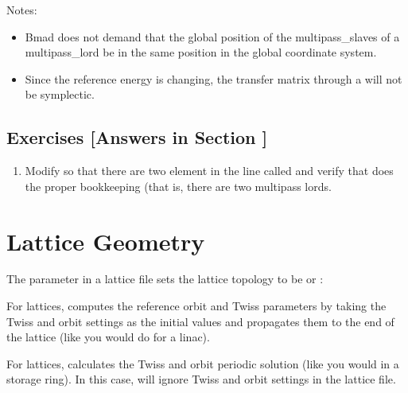 \documentclass{hitec}     %
\newcommand{\Section}[1]{\section{#1}\vspace*{-1ex}}
\begin{document}
Notes:
\vspace{-5 pt}
\begin{itemize}
\item 
Bmad does not demand that the global position of the multipass_slaves of a multipass_lord be in
the same position in the global coordinate system.
\item
Since the reference energy is changing, the transfer matrix through a  will
not be symplectic.
\end{itemize}

\newpage

\subsection{Exercises [Answers in Section ]}
\label{s:multipass.ex}

\begin{enumerate}[label=\thesection.\arabic{enumi}]
\item
Modify  so that there are two element in the  line called  and
verify that \bmad does the proper bookkeeping (that is, there are two  multipass lords.
\end{enumerate}

\newpage

\Section{Lattice Geometry}
\label{s:lat.geom}

The  parameter in a lattice file sets the lattice topology to be
 or :
\vspace*{-20pt}
\begin{description}
\item {} \Newline 
For  lattices, \bmad computes the reference orbit and Twiss parameters by taking the
 Twiss and  orbit settings as the initial values and
propagates them to the end of the lattice (like you would do for a linac).
\item {} \Newline 
For  lattices, \bmad calculates the Twiss and orbit periodic solution (like you would in
a storage ring).  In this case, \bmad will ignore Twiss and orbit settings in the lattice file.
\end{description}
\end{document}

